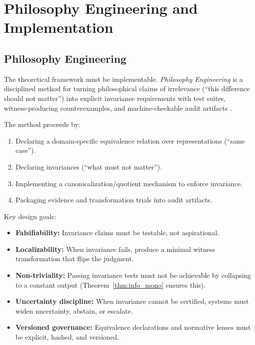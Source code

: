 \documentclass[12pt,letterpaper]{article}
\theoremstyle{definition}
\theoremstyle{remark}
\begin{document}
\section{Philosophy Engineering and Implementation}
\label{sec:engineering}

\subsection{Philosophy Engineering}

The theoretical framework must be implementable. \emph{Philosophy Engineering} is a disciplined method for turning philosophical claims of irrelevance (``this difference should not matter'') into explicit invariance requirements with test suites, witness-producing counterexamples, and machine-checkable audit artifacts \cite{bond2025eip}.

The method proceeds by:
\begin{enumerate}[label=(\roman*)]
    \item Declaring a domain-specific equivalence relation over representations (``same case'').
    \item Declaring invariances (``what must not matter'').
    \item Implementing a canonicalization/quotient mechanism to enforce invariance.
    \item Packaging evidence and transformation trials into audit artifacts.
\end{enumerate}

Key design goals:
\begin{itemize}
    \item \textbf{Falsifiability:} Invariance claims must be testable, not aspirational.
    \item \textbf{Localizability:} When invariance fails, produce a minimal witness transformation that flips the judgment.
    \item \textbf{Non-triviality:} Passing invariance tests must not be achievable by collapsing to a constant output (Theorem~\ref{thm:info_mono} ensures this).
    \item \textbf{Uncertainty discipline:} When invariance cannot be certified, systems must widen uncertainty, abstain, or escalate.
    \item \textbf{Versioned governance:} Equivalence declarations and normative lenses must be explicit, hashed, and versioned.
\end{itemize}
\end{document}

